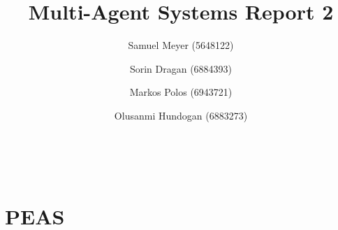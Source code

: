 \documentclass[a4paper,11pt]{article}
\makeatletter
\theoremstyle{mytheor}
\renewcommand{\maketitle}{
\begin{center}
\vspace{2ex}
{\huge \textsc{\@title}}
\vspace{1ex}
\\
\begin{center}
\@author
\end{center}
\end{center}
}
\makeatother
\begin{document}
\title{Multi-Agent Systems Report 2}

\author{Samuel Meyer (5648122) \and Sorin Dragan (6884393) \and Markos Polos (6943721) \and Olusanmi Hundogan (6883273)}

\maketitle
\hline
% 
\section{PEAS}





\end{document}
